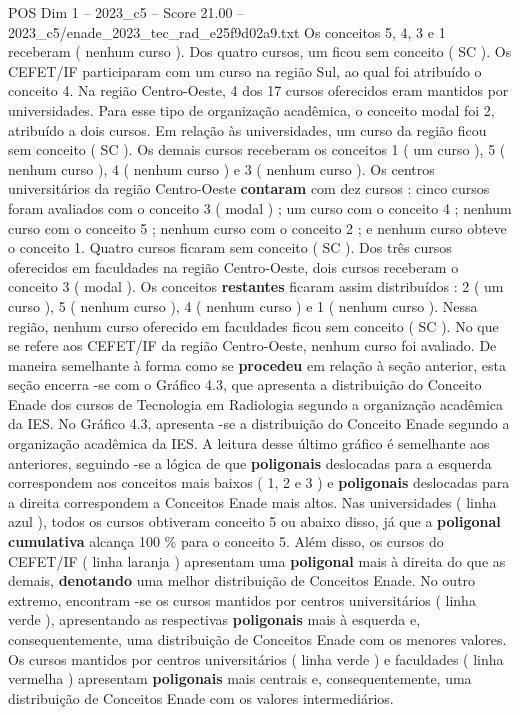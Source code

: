 \begin{textsample}{POS Dim 1 – 2023\_c5 – Score 21.00 – 2023\_c5/enade\_2023\_tec\_rad\_e25f9d02a9.txt}
Os conceitos 5, 4, 3 e 1 receberam ( nenhum curso ).
Dos quatro cursos, um ficou sem conceito ( SC ).
Os CEFET/IF participaram com um curso na região Sul, ao qual foi atribuído o conceito 4.
Na região Centro-Oeste, 4 dos 17 cursos oferecidos eram mantidos por universidades.
Para esse tipo de organização acadêmica, o conceito modal foi 2, atribuído a dois cursos.
Em relação às universidades, um curso da região ficou sem conceito ( SC ).
Os demais cursos receberam os conceitos 1 ( um curso ), 5 ( nenhum curso ), 4 ( nenhum curso ) e 3 ( nenhum curso ).
Os centros universitários da região Centro-Oeste \textbf{contaram} com dez cursos : cinco cursos foram avaliados com o conceito 3 ( modal ) ; um curso com o conceito 4 ; nenhum curso com o conceito 5 ; nenhum curso com o conceito 2 ; e nenhum curso obteve o conceito 1.
Quatro cursos ficaram sem conceito ( SC ).
Dos três cursos oferecidos em faculdades na região Centro-Oeste, dois cursos receberam o conceito 3 ( modal ).
Os conceitos \textbf{restantes} ficaram assim distribuídos : 2 ( um curso ), 5 ( nenhum curso ), 4 ( nenhum curso ) e 1 ( nenhum curso ).
Nessa região, nenhum curso oferecido em faculdades ficou sem conceito ( SC ).
No que se refere aos CEFET/IF da região Centro-Oeste, nenhum curso foi avaliado.
De maneira semelhante à forma como se \textbf{procedeu} em relação à seção anterior, esta seção encerra -se com o Gráfico 4.3, que apresenta a distribuição do Conceito Enade dos cursos de Tecnologia em Radiologia segundo a organização acadêmica da IES.
No Gráfico 4.3, apresenta -se a distribuição do Conceito Enade segundo a organização acadêmica da IES.
A leitura desse último gráfico é semelhante aos anteriores, seguindo -se a lógica de que \textbf{poligonais} deslocadas para a esquerda correspondem aos conceitos mais baixos ( 1, 2 e 3 ) e \textbf{poligonais} deslocadas para a direita correspondem a Conceitos Enade mais altos.
Nas universidades ( linha azul ), todos os cursos obtiveram conceito 5 ou abaixo disso, já que a \textbf{poligonal} \textbf{cumulativa} alcança 100 \% para o conceito 5.
Além disso, os cursos do CEFET/IF ( linha laranja ) apresentam uma \textbf{poligonal} mais à direita do que as demais, \textbf{denotando} uma melhor distribuição de Conceitos Enade.
No outro extremo, encontram -se os cursos mantidos por centros universitários ( linha verde ), apresentando as respectivas \textbf{poligonais} mais à esquerda e, consequentemente, uma distribuição de Conceitos Enade com os menores valores.
Os cursos mantidos por centros universitários ( linha verde ) e faculdades ( linha vermelha ) apresentam \textbf{poligonais} mais centrais e, consequentemente, uma distribuição de Conceitos Enade com os valores intermediários.

\end{textsample}
